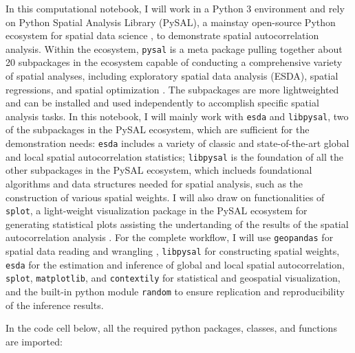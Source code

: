 \documentclass[
]{aft}
\begin{document}
In this computational notebook, I will work in a Python 3 environment
and rely on Python Spatial Analysis Library (PySAL), a mainstay
open-source Python ecosystem for spatial data science
\citep{Kang:2020c}, to demonstrate spatial autocorrelation analysis.
Within the ecosystem, \texttt{pysal} is a meta package pulling together
about 20 subpackages in the ecosystem capable of conducting a
comprehensive variety of spatial analyses, including exploratory spatial
data analysis (ESDA), spatial regressions, and spatial optimization
\citep{Rey2022}. The subpackages are more lightweighted and can be
installed and used independently to accomplish specific spatial analysis
tasks. In this notebook, I will mainly work with \texttt{esda} and
\texttt{libpysal}, two of the subpackages in the PySAL ecosystem, which
are sufficient for the demonstration needs: \texttt{esda} includes a
variety of classic and state-of-the-art global and local spatial
autocorrelation statistics; \texttt{libpysal} is the foundation of all
the other subpackages in the PySAL ecosystem, which inclueds
foundational algorithms and data structures needed for spatial analysis,
such as the construction of various spatial weights. I will also draw on
functionalities of \texttt{splot}, a light-weight visualization package
in the PySAL ecosystem for generating statistical plots assisting the
undertanding of the results of the spatial autocorrelation analysis
\citep{Lumnitz2020}. For the complete workflow, I will use
\texttt{geopandas} for spatial data reading and wrangling
\citep{joris_van_den_bossche_2024_12625316}, \texttt{libpysal} for
constructing spatial weights, \texttt{esda} for the estimation and
inference of global and local spatial autocorrelation, \texttt{splot},
\texttt{matplotlib}, and \texttt{contextily} for statistical and
geospatial visualization, and the built-in python module \texttt{random}
to ensure replication and reproducibility of the inference results.

In the code cell below, all the required python packages, classes, and
functions are imported:
\end{document}
